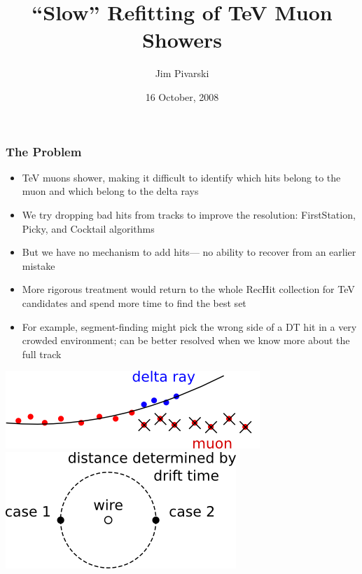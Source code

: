 \documentclass[compress]{beamer}
\title{``Slow'' Refitting of TeV Muon Showers}
\author{Jim Pivarski}
\institute{Texas A\&M University}
\date{16 October, 2008}
\begin{document}
\frame{\titlepage}


\small

\begin{frame}
\frametitle{The Problem}

\begin{itemize}\setlength{\itemsep}{0.1 cm}
\item TeV muons shower, making it difficult to identify which hits
  belong to the muon and which belong to the delta rays
\item We try dropping bad hits from tracks to improve the resolution:
  FirstStation, Picky, and Cocktail algorithms
\item But we have no mechanism to add hits--- no ability to recover from
  an earlier mistake
\item More rigorous treatment would return to the whole RecHit collection
  for TeV candidates and spend more time to find the best set
\item For example, segment-finding might pick the wrong side of a DT
  hit in a very crowded environment; can be better resolved when we know
  more about the full track
\end{itemize}

\begin{center}
\includegraphics[width=0.5\linewidth]{delta_ray_mistake.png} \hfill \includegraphics[width=0.4\linewidth]{dt_ambiguity.png}
\end{center}

\end{frame}
\end{document}
